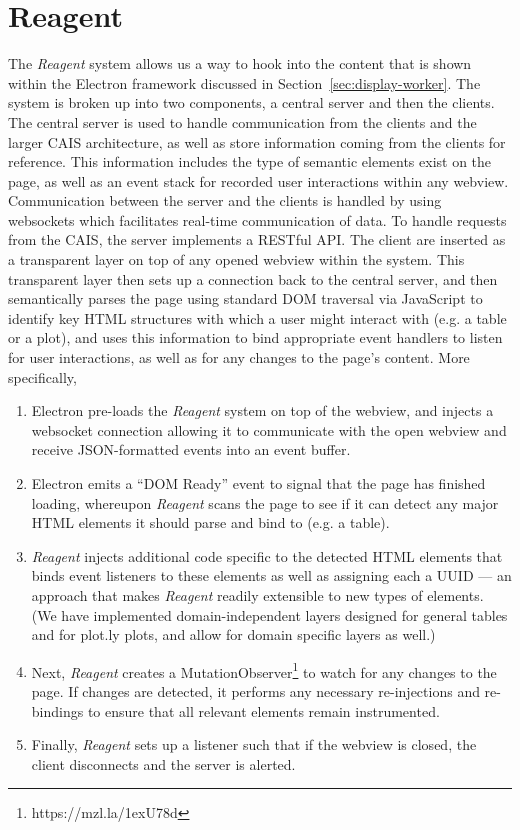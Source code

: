 \section{Reagent}\label{sec:reagent}

The \textit{Reagent} system allows us a way to hook into the content that is
shown within the Electron framework discussed in Section~\ref{sec:display-worker}. The
system is broken up into two components, a central server and then the clients.
The central server is used to handle communication from the clients and the
larger CAIS architecture, as well as store information coming from the clients
for reference. This information includes the type of semantic elements exist on
the page, as well as an event stack for recorded user interactions within any
webview. Communication between the server and the clients is handled by using
websockets which facilitates real-time communication of data. To handle requests
from the CAIS, the server implements a RESTful API. The client are inserted as a
transparent layer on top of any opened webview within the system.  This
transparent layer then sets up a connection back to the central server, and then
semantically parses the page using standard DOM traversal via JavaScript
to identify key HTML structures with which a user
might interact with (e.g. a table or a plot), and uses this information to bind
appropriate event handlers to listen for user interactions, as well as for any
changes to the page's content. More specifically,

\begin{enumerate}
    \item Electron pre-loads the \textit{Reagent} system on top of the webview, and injects a websocket connection allowing it to communicate with the open webview and receive JSON-formatted events into an event buffer.
    \item Electron emits a ``DOM Ready'' event to signal that the page has finished loading, whereupon \textit{Reagent} scans the page to see if it can detect any major HTML elements it should parse and bind to (e.g. a table).
    \item \textit{Reagent} injects additional code specific to the detected HTML elements that binds event listeners to these elements as well as assigning each a UUID --- an approach that makes \textit{Reagent} readily extensible to new types of elements. (We have implemented domain-independent layers designed for general tables and for plot.ly plots, and allow for domain specific layers as well.)
    \item Next, \textit{Reagent} creates a MutationObserver\footnote{https://mzl.la/1exU78d} to watch for any changes to the page. If changes are detected, it performs any necessary re-injections and re-bindings to ensure that all relevant elements remain instrumented.
    \item Finally, \textit{Reagent} sets up a listener such that if the webview
    is closed, the client disconnects and the server is alerted.
\end{enumerate}

